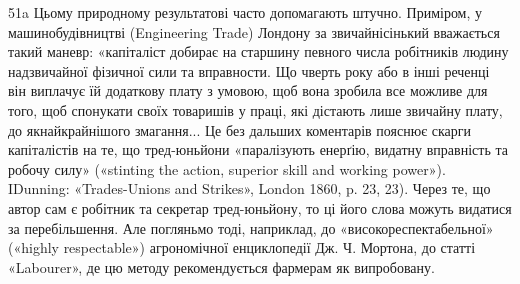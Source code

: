 51a Цьому природному результатові часто допомагають штучно.
Приміром, у машинобудівництві (Engineering Trade) Лондону за звичайнісінький
вважається такий маневр: «капіталіст добирає на старшину
певного числа робітників людину надзвичайної фізичної сили та вправности.
Що чверть року або в інші реченці він виплачує їй додаткову плату
з умовою, щоб вона зробила все можливе для того, щоб спонукати своїх
товаришів у праці, які дістають лише звичайну плату, до якнайкрайнішого
змагання... Це без дальших коментарів пояснює скарги капіталістів на
те, що тред-юньйони «паралізують енерґію, видатну вправність та
робочу силу» («stinting the action, superior skill and working power»).
IDunning: «Trades-Unions and Strikes», London 1860, p. 23, 23). Через
те, що автор сам є робітник та секретар тред-юньйону, то ці його слова
можуть видатися за перебільшення. Але погляньмо тоді, наприклад,
до «високореспектабельної» («highly respectable») агрономічної енциклопедії
Дж. Ч. Мортона, до статті «Labourer», де цю методу рекомендується
фармерам як випробовану.